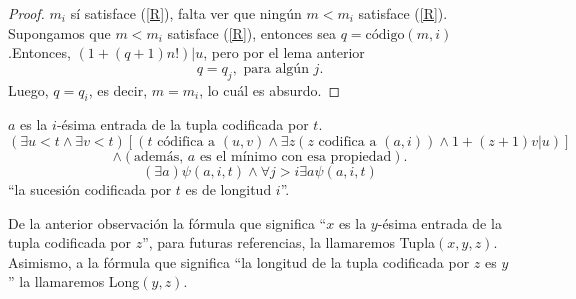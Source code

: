 \begin{proof}
    $m_i$ sí satisface (\ref{R}), falta ver que ningún $m<m_i$ satisface (\ref{R}). Supongamos que $m<m_i$ satisface (\ref{R}), entonces sea $q=\text{código}(m,i)$.Entonces, $(1+(q+1)n!)|u$, pero por el lema anterior
    \[q=q_j,\text{ para algún }j.\]
    Luego, $q=q_i$, es decir, $m=m_i$, lo cuál es absurdo.
\end{proof}
\begin{obs}
    $a$ es la $i$-ésima entrada de la tupla codificada por $t$.
    \[(\exists u<t\land \exists v<t)[(t\text{ códifica a }(u,v)\land \exists z(z\text{ codifica a }(a,i))\land 1+(z+1)v|u)]\]
    \[\land(\text{además, $a$ es el mínimo con esa propiedad}).\]
    \[(\exists a)\psi(a,i,t)\land \forall j>i\exists a\psi(a,i,t)\]
    ``la sucesión codificada por $t$ es de longitud $i$''.
\end{obs}
De la anterior observación la fórmula que significa ``$x$ es la $y$-ésima entrada de la tupla codificada por $z$'', para futuras referencias, la llamaremos Tupla$(x,y,z)$. Asimismo, a la fórmula que  significa ``la longitud de la tupla codificada por $z$ es $y$'' la llamaremos Long$(y,z)$.
